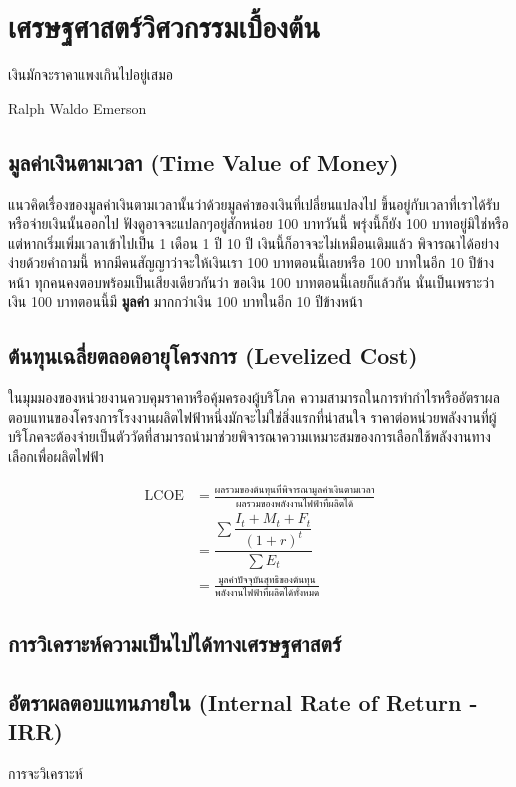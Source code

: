 \documentclass[a4paper,nobib,openany]{tufte-book}
\begin{document}
\chapter{เศรษฐศาสตร์วิศวกรรมเบื้องต้น}
\label{sec:orga169bdb}

\epigraph{เงินมักจะราคาแพงเกินไปอยู่เสมอ}{Ralph Waldo Emerson}

\section{มูลค่าเงินตามเวลา (Time Value of Money)}
\label{sec:org035fc76}
แนวคิดเรื่องของมูลค่าเงินตามเวลานั้นว่าด้วยมูลค่าของเงินที่เปลี่ยนแปลงไป
ขึ้นอยู่กับเวลาที่เราได้รับหรือจ่ายเงินนั้นออกไป
ฟังดูอาจจะแปลกๆอยู่สักหน่อย 100 บาทวันนี้ พรุ่งนี้ก็ยัง 100
บาทอยู่มิใช่หรือ แต่หากเริ่มเพิ่มเวลาเข้าไปเป็น 1 เดือน 1 ปี 10 ปี
เงินนี้ก็อาจจะไม่เหมือนเดิมแล้ว พิจารณาได้อย่างง่ายด้วยคำถามนี้
หากมีคนสัญญาว่าจะให้เงินเรา 100 บาทตอนนี้เลยหรือ 100 บาทในอีก 10
ปีข้างหน้า ทุกคนคงตอบพร้อมเป็นเสียงเดียวกันว่า ขอเงิน 100
บาทตอนนี้เลยก็แล้วกัน นั่นเป็นเพราะว่าเงิน 100
บาทตอนนี้มี \textbf{มูลค่า} มากกว่าเงิน 100 บาทในอีก 10 ปีข้างหน้า

\section{ต้นทุนเฉลี่ยตลอดอายุโครงการ (Levelized Cost)}
\label{sec:org8dde90d}
ในมุมมองของหน่วยงานควบคุมราคาหรือคุ้มครองผู้บริโภค
ความสามารถในการทำกำไรหรืออัตราผลตอบแทนของโครงการโรงงานผลิตไฟฟ้าหนึ่งมักจะไม่ใช่สิ่งแรกที่น่าสนใจ
ราคาต่อหน่วยพลังงานที่ผู้บริโภคจะต้องจ่ายเป็นตัววัดที่สามารถนำมาช่วยพิจารณาความเหมาะสมของการเลือกใช้พลังงานทางเลือกเพื่อผลิตไฟฟ้า

\[\begin{aligned}
  \text{LCOE} &= \frac{\text{ผลรวมของต้นทุนที่พิจารณามูลค่าเงินตามเวลา}}{\text{ผลรวมของพลังงานไฟฟ้าที่ผลิตได้}} \\[10pt]
              &= \dfrac{\sum \dfrac{I_t + M_t + F_t}{(1+r)^t}}{\sum E_t} \\[10pt]
              &= \frac{\text{มูลค่าปัจจุบันสุทธิของต้นทุน}}{\text{พลังงานไฟฟ้าที่ผลิตได้ทั้งหมด}}\end{aligned}\]

\section{การวิเคราะห์ความเป็นไปได้ทางเศรษฐศาสตร์}
\label{sec:org30ec40a}
\section{อัตราผลตอบแทนภายใน (Internal Rate of Return - IRR)}
\label{sec:orgb462339}
การจะวิเคราะห์
\end{document}
